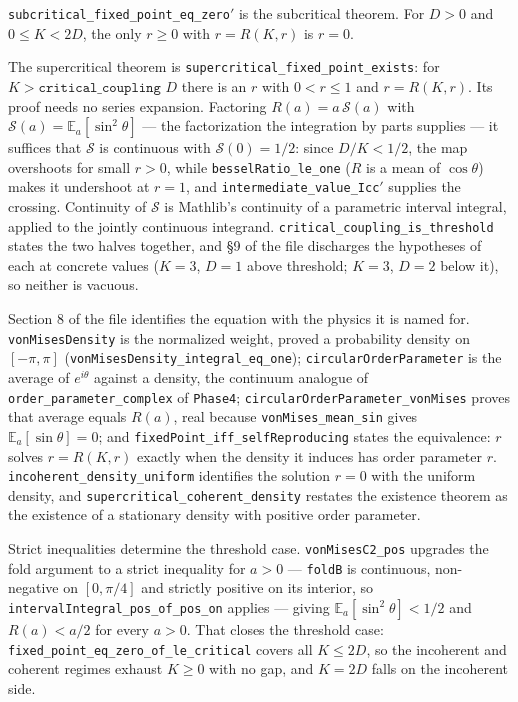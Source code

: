 \documentclass{article}
\begin{document}
\nolinkurl{subcritical_fixed_point_eq_zero}$'$ is the subcritical theorem. For $D>0$ and $0 \le K < 2D$, the only $r \ge 0$ with $r = R(K,r)$ is $r = 0$.

The supercritical theorem is \nolinkurl{supercritical_fixed_point_exists}: for $K > \texttt{critical\_coupling } D$ there is an $r$ with $0 < r \le 1$ and $r = R(K,r)$. Its proof needs no series expansion. Factoring $R(a) = a\,\mathcal{S}(a)$ with $\mathcal{S}(a) = \mathbb{E}_a[\sin^2\theta]$ --- the factorization the integration by parts supplies --- it suffices that $\mathcal{S}$ is continuous with $\mathcal{S}(0) = 1/2$: since $D/K < 1/2$, the map overshoots for small $r > 0$, while \nolinkurl{besselRatio_le_one} ($R$ is a mean of $\cos\theta$) makes it undershoot at $r = 1$, and \nolinkurl{intermediate_value_Icc}$'$ supplies the crossing. Continuity of $\mathcal{S}$ is Mathlib's continuity of a parametric interval integral, applied to the jointly continuous integrand. \nolinkurl{critical_coupling_is_threshold} states the two halves together, and \S9 of the file discharges the hypotheses of each at concrete values ($K = 3$, $D = 1$ above threshold; $K = 3$, $D = 2$ below it), so neither is vacuous.

Section 8 of the file identifies the equation with the physics it is named for. \texttt{vonMisesDensity} is the normalized weight, proved a probability density on $[-\pi,\pi]$ (\nolinkurl{vonMisesDensity_integral_eq_one}); \texttt{circularOrderParameter} is the average of $e^{i\theta}$ against a density, the continuum analogue of \nolinkurl{order_parameter_complex} of \texttt{Phase4}; \nolinkurl{circularOrderParameter_vonMises} proves that average equals $R(a)$, real because \nolinkurl{vonMises_mean_sin} gives $\mathbb{E}_a[\sin\theta] = 0$; and \nolinkurl{fixedPoint_iff_selfReproducing} states the equivalence: $r$ solves $r = R(K,r)$ exactly when the density it induces has order parameter $r$. \nolinkurl{incoherent_density_uniform} identifies the solution $r = 0$ with the uniform density, and \nolinkurl{supercritical_coherent_density} restates the existence theorem as the existence of a stationary density with positive order parameter.

Strict inequalities determine the threshold case. \nolinkurl{vonMisesC2_pos} upgrades the fold argument to a strict inequality for $a > 0$ --- \texttt{foldB} is continuous, non-negative on $[0,\pi/4]$ and strictly positive on its interior, so \nolinkurl{intervalIntegral_pos_of_pos_on} applies --- giving $\mathbb{E}_a[\sin^2\theta] < 1/2$ and $R(a) < a/2$ for every $a > 0$. That closes the threshold case: \nolinkurl{fixed_point_eq_zero_of_le_critical} covers all $K \le 2D$, so the incoherent and coherent regimes exhaust $K \ge 0$ with no gap, and $K = 2D$ falls on the incoherent side.
\end{document}
